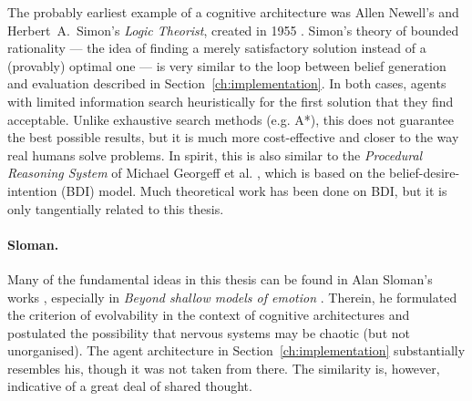 The probably earliest example of a cognitive architecture was Allen Newell's and Herbert~A.~Simon's {\em Logic Theorist}, created in 1955 \cite[p.\ 44]{crevier93}. Simon's theory of bounded rationality \cite{Gigerenzer2001} --- the idea of finding a merely satisfactory solution instead of a (provably) optimal one --- is very similar to the loop between belief generation and evaluation described in Section~\ref{ch:implementation}. In both cases, agents with limited information search heuristically for the first solution that they find acceptable. Unlike exhaustive search methods (e.g. A*), this does not guarantee the best possible results, but it is much more cost-effective and closer to the way real humans solve problems. In spirit, this is also similar to the {\em Procedural Reasoning System} of Michael Georgeff et al. \cite{pcs}, which is based on the belief-desire-intention (BDI) model\cite{Rao95bdiagents, Bratman87}. Much theoretical work has been done on BDI, but it is only tangentially related to this thesis.

\paragraph{Sloman.} Many of the fundamental ideas in this thesis can be found in Alan Sloman's works \cite{sloman1993, sloman1997, sloman1999, sloman2000, slomanSimAgent}, especially in {\em Beyond shallow models of emotion} \cite{sloman2000}. Therein, he formulated the criterion of evolvability in the context of cognitive architectures and postulated the possibility that nervous systems may be chaotic (but not unorganised). The agent architecture in Section~\ref{ch:implementation} substantially resembles his, though it was not taken from there. The similarity is, however, indicative of a great deal of shared thought.

